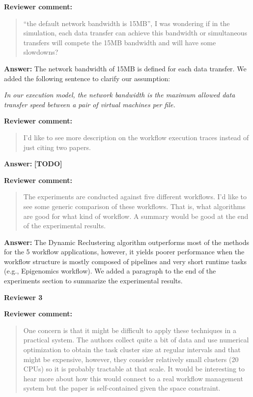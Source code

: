 \documentclass{letter}
\newenvironment{review}%
{\textbf{Reviewer comment:}\begin{quote}}%
{\end{quote}}%
\newcommand{\todo}[1]{%
      \color{red}\textbf{[TODO]} #1\color{black}}
\newcommand{\answer}[1]{%
      \textbf{Answer:} #1}
\newcommand{\revised}[1]{\emph{#1}\color{black}}
\begin{document}
\begin{letter}{}
\begin{review}
``the default network bandwidth is 15MB'', I was wondering if in the simulation, each data transfer can achieve this bandwidth or simultaneous transfers will compete the 15MB bandwidth and will have some slowdowns?
\end{review}

\answer{The network bandwidth of 15MB is defined for each data transfer. We added the following sentence to clarify our assumption:}

\revised{In our execution model, the network bandwidth is the maximum allowed data transfer speed between a pair of virtual machines per file.}



\begin{review}
I'd like to see more description on the workflow execution traces instead of just citing two papers.
\end{review}

\answer{\todo{}}



\begin{review}
The experiments are conducted against five different workflows. I'd like to see some generic comparison of these workflows. That is, what algorithms are good for what kind of workflow. A summary would be good at the end of the experimental results.
\end{review}

\answer{The Dynamic Reclustering algorithm outperforms most of the methods for the 5 workflow applications, however, it yields poorer performance when the workflow structure is mostly composed of pipelines and very short runtime tasks (e.g., Epigenomics workflow). We added a paragraph to the end of the experiments section to summarize the experimental results.}



\newpage

%
%
\textbf{Reviewer 3}

\begin{review}
One concern is that it might be difficult to apply these techniques in a practical system.  The authors collect quite a bit of data and use numerical optimization to obtain the task cluster size at regular intervals and that might be expensive, however, they consider relatively small clusters (20 CPUs) so it is probably tractable at that scale.  It would be interesting to hear more about how this would connect to a real workflow management system but the paper is self-contained given the space constraint. 
\end{review}


\end{letter}
\end{document}
